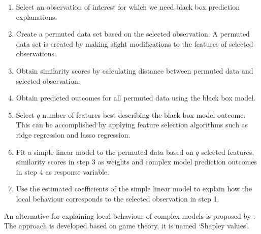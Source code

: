 \documentclass[11pt,a4paper,]{article}
\providecommand{\tightlist}{%
  \setlength{\itemsep}{0pt}\setlength{\parskip}{0pt}}
\begin{document}
\begin{enumerate}
\def\labelenumi{\arabic{enumi}.}
\tightlist
\item
  Select an observation of interest for which we need black box prediction explanations.
\item
  Create a permuted data set based on the selected observation. A permuted data set is created by making slight modifications to the features of selected observations.
\item
  Obtain similarity scores by calculating distance between permuted data and selected observation.
\item
  Obtain predicted outcomes for all permuted data using the black box model.
\item
  Select \(q\) number of features best describing the black box model outcome. This can be accomplished by applying feature selection algorithms such as ridge regression and lasso regression.
\item
  Fit a simple linear model to the permuted data based on \(q\) selected features, similarity scores in step 3 as weights and complex model prediction outcomes in step 4 as response variable.
\item
  Use the estimated coefficients of the simple linear model to explain how the local behaviour corresponds to the selected observation in step 1.
\end{enumerate}

An alternative for explaining local behaviour of complex models is proposed by \textcite{lundberg2017unified}. The approach is developed based on game theory, it is named `Shapley values'.
\end{document}
